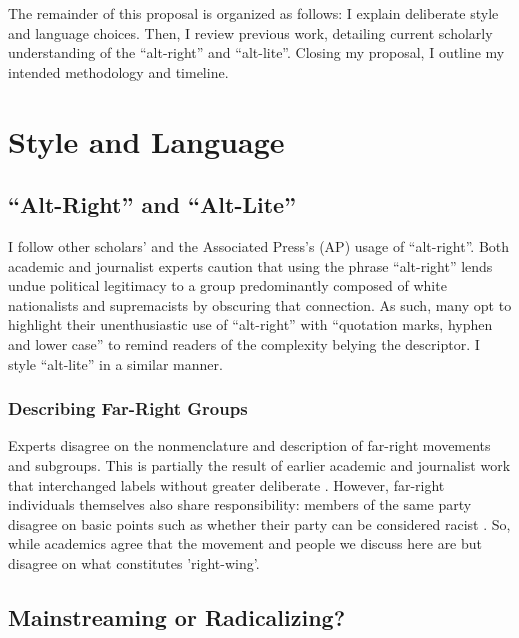 \documentclass[acmlarge, screen, authorversion]{acmart}
\begin{document}
\medskip

The remainder of this proposal is organized as follows: I explain deliberate style and language
choices. Then, I review previous work, detailing current scholarly understanding of the “alt-right”
and “alt-lite”. Closing my proposal, I outline my intended methodology and timeline.

\section{Style and Language}

\subsection{“Alt-Right” and “Alt-Lite”}

I follow other scholars’ \cite{hartzellAltWhiteConceptualizingAltRight, massanariRethinkingResearchEthics2018} and the
Associated Press’s (AP) \cite{johndaniszewskiWritingAltright2016} usage of “alt-right”.
Both academic and journalist experts caution that using the
phrase “alt-right” lends undue political legitimacy to a group predominantly
composed of white nationalists and supremacists by obscuring that
connection. As such, many opt to highlight their unenthusiastic use of
“alt-right” with “quotation marks, hyphen and lower case”
\cite{johndaniszewskiWritingAltright2016} to remind readers of the complexity belying the
descriptor. I style “alt-lite” in a similar manner.

\subsubsection{Describing Far-Right Groups}

Experts disagree on the nonmenclature and description of far-right movements and
subgroups. This is partially the result of earlier academic and journalist work
that interchanged labels without greater deliberate \cite{muddeFarRightToday2019}. However,
far-right individuals themselves also share responsibility: members of the same party disagree
on basic points
such as whether their party can be considered racist \cite{muddeFarRightToday2019}.
So, while academics agree that the movement
and people we discuss here are
but disagree on what constitutes 'right-wing'.

\subsection{Mainstreaming or Radicalizing?}
\end{document}
